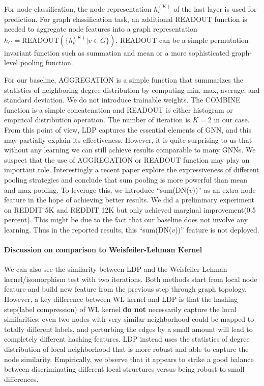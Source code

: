 \documentclass[11pt,onecolumn]{article}
\newcommand{\DOM}       {{LDP}\xspace}
\begin{document}
For node classification, the node representation $h_v^{(K)}$ of the last layer is used for prediction. For graph classification task, an additional READOUT function is needed to aggregate node features into a graph representation $h_G = \text{READOUT}(\{ h_v^{(K)} | v \in G  \})$. READOUT can be a simple permutation invariant function such as summation and mean or a more sophisticated graph-level pooling function. \cite{ying2018hierarchical, zhang2018end}

For our baseline, AGGREGATION is a simple function that summarizes the statistics of neighboring degree distribution by computing min, max, average, and standard deviation. We do not introduce trainable weights. The COMBINE function is a simple concatenation and READOUT is either histogram or empirical distribution operation. The number of iteration is $K=2$ in our case. From this point of view, \DOM{} captures the essential elements of GNN, and this may partially explain its effectiveness. However, it is quite surprising to us that without any learning we can still achieve results comparable to many GNNs. We suspect that the use of AGGREGATION or READOUT function may play an important role. Interestingly a recent paper\cite{xu2018powerful} explore the expressiveness of different pooling strategies and conclude that sum pooling is more powerful than mean and max pooling. 
To leverage this, we introduce  ``sum(DN($v$))'' as an extra node feature in the hope of achieving better results. We did a preliminary experiment on REDDIT 5K and REDDIT 12K but only achieved marginal improvement(0.5 percent). This might be due to the fact that our baseline does not involve any learning. Thus in the reported results, this ``sum(DN($v$))'' feature is not deployed. 
 
\paragraph{Discussion on  comparison to Weisfeiler-Lehman Kernel}
We can also see the similarity between \DOM{} and the Weisfeiler-Lehman kernel/isomorphism test with two iterations.  Both methods start from local node feature and build new feature from the previous step through graph topology. However, a key difference between WL kernel and \DOM{} is that the hashing step(label compression) of WL kernel {\bf do not} necessarily capture the local similarities: even two nodes with very similar neighborhood could be mapped to totally different labels, and perturbing the edges by a small amount will lead to completely different hashing features. \DOM{} instead uses the statistics of degree distribution of local neighborhood that is more robust and able to capture the node similarity. Empirically, we observe that it appears to strike a good balance between discriminating different local structures versus being robust to small differences.
\end{document}
